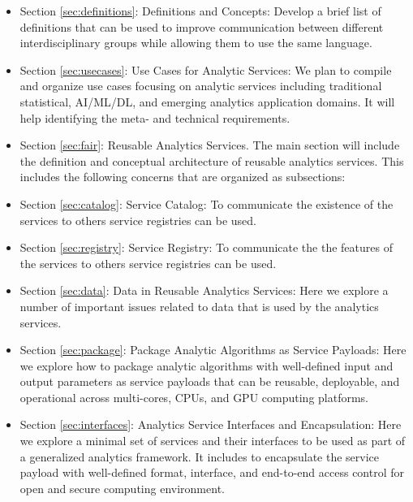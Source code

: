 \begin{itemize}
  
\item Section \ref{sec:definitions}: Definitions and Concepts: Develop
  a brief list of definitions that can be used to improve
  communication between different interdisciplinary groups while
  allowing them to use the same language.

\item Section \ref{sec:usecases}: Use Cases for Analytic Services: We plan to
  compile and organize use cases focusing on analytic services
  including traditional statistical, AI/ML/DL, and emerging analytics
  application domains. It will help identifying the meta- and
  technical requirements.

\item Section \ref{sec:fair}: Reusable Analytics Services. The main section
  will include the definition and conceptual architecture of reusable
  analytics services. This includes the following concerns that are
  organized as subsections:
  
\item Section \ref{sec:catalog}: Service Catalog: To communicate the
  existence of the services to others service
  registries can be used.

\item Section \ref{sec:registry}: Service Registry: To communicate the
  the features of the services to others service
  registries can be used.

\item Section \ref{sec:data}: Data in Reusable Analytics Services:
  Here we explore a number of important issues related to data that is
  used by the analytics services.

\item Section \ref{sec:package}: Package Analytic Algorithms as
  Service Payloads: Here we explore how to package analytic algorithms
  with well-defined input and output parameters as service payloads
  that can be reusable, deployable, and operational across
  multi-cores, CPUs, and GPU computing platforms.

\item Section \ref{sec:interfaces}: Analytics Service Interfaces and
  Encapsulation: Here we explore a minimal set of services and their
  interfaces to be used as part of a generalized analytics
  framework. It includes to encapsulate the service payload with
  well-defined format, interface, and end-to-end access control for
  open and secure computing environment.
  

\end{itemize}
